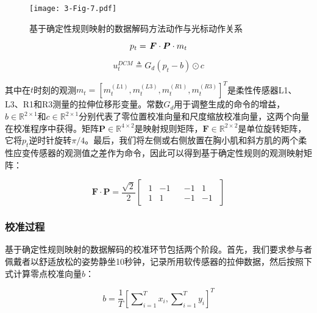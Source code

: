 \begin{figure}[!t]
    \centering
    \texttt{[image: 3-Fig-7.pdf]}
    \caption{基于确定性规则映射的数据解码方法动作与光标动作关系}
    \label{3-fig-7}
\end{figure} 

\begin{equation}
\label{eq1}
{p_t} = {\kern 1pt} \boldsymbol{{F}} \cdot \boldsymbol{{P}} \cdot {m_t}
\end{equation}   

\begin{equation}
\label{eq2}
u_t^{DCM} \triangleq {G_d}\left( {{p_t} - b} \right) \odot c
\end{equation}   

其中在$t$时刻的观测${m_t} = {[m_t^{(L1)},m_t^{(L3)},m_t^{(R1)},m_t^{(R3)}]^T}$是柔性传感器L1、L3、R1和R3测量的拉伸位移形变量。常数${G_d}$用于调整生成的命令的增益，$b\in {\mathbb{R}^{2 \times 1}}$和$c \in {\mathbb{R}^{2 \times 1}}$分别代表了零位置校准向量和尺度缩放校准向量，这两个向量在校准程序中获得。矩阵$\boldsymbol{P} \in {\mathbb{R}^{4 \times 2}}$是映射规则矩阵，$\boldsymbol{F} \in {\mathbb{R}^{2 \times 2}}$是单位旋转矩阵，它将$p_t$逆时针旋转$\pi /4$。最后，我们将左侧或右侧放置在胸小肌和斜方肌的两个柔性应变传感器的观测值之差作为命令，因此可以得到基于确定性规则的观测映射矩阵：

\[{\boldsymbol{F}} \cdot {\boldsymbol{P}} = \frac{{\sqrt 2 }}{2}\left[ {\begin{array}{*{20}{c}}
{\begin{array}{*{20}{c}}
1&{ - 1}  \\  
1&1 
\end{array}}&{\begin{array}{*{20}{c}}
{ - 1}&1  \\  
{ - 1}&{ - 1} 
\end{array}} 
\end{array}} \right]\]   

\subsubsection{校准过程}
基于确定性规则映射的数据解码的校准环节包括两个阶段。首先，我们要求参与者佩戴者以舒适放松的姿势静坐10秒钟，记录所用软传感器的拉伸数据，然后按照下式计算零点校准向量$b$：

\begin{equation}
\label{eq10}
b = \frac{1}{T}{\left[ {\sum\nolimits_{i = 1}^T {{x_i}} ,\sum\nolimits_{i = 1}^T {{y_i}} } \right]^T}
\end{equation}    


